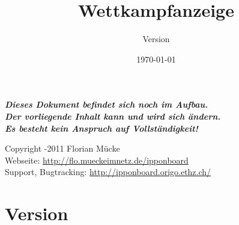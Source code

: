 ﻿\documentclass[11pt,numbers=noenddot]{scrreprt}
\title{{\IB} Wettkampfanzeige}
\subtitle{Version \IBVersion}
\date{\today}
\begin{document}
\maketitle

\thispagestyle{empty}

\vspace*{\fill}

{\centering\bfseries\itshape\LARGE
Dieses Dokument befindet sich noch im Aufbau.\\
Der vorliegende Inhalt kann und wird sich ändern.\\
Es besteht kein Anspruch auf Vollständigkeit! \par}

\vspace*{\fill}

\begin{center}
{%
Copyright -2011 Florian Mücke \\
Webseite: \url{http://flo.mueckeimnetz.de/ipponboard} \\
Support, Bugtracking: \url{http://ipponboard.origo.ethz.ch/}}
\end{center}


\renewcommand\contentsname{Inhalt}
\tableofcontents

\chapter{Version}
\end{document}
